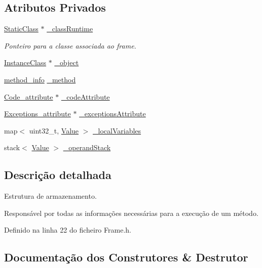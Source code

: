 \subsection*{Atributos Privados}
\begin{DoxyCompactItemize}
\item 
\hyperlink{classStaticClass}{Static\+Class} $\ast$ \hyperlink{classFrame_aa6f380f48c5bac83780daed06dc04f9e}{\+\_\+class\+Runtime}
\begin{DoxyCompactList}\small\item\em Ponteiro para a classe associada ao frame. \end{DoxyCompactList}\item 
\hyperlink{classInstanceClass}{Instance\+Class} $\ast$ \hyperlink{classFrame_a618b0873a50306f7805ea09685e8eee9}{\+\_\+object}
\item 
\hyperlink{structmethod__info}{method\+\_\+info} \hyperlink{classFrame_af9658f71efb91988fa39a224ce9ec9c6}{\+\_\+method}
\item 
\hyperlink{structCode__attribute}{Code\+\_\+attribute} $\ast$ \hyperlink{classFrame_a0b7e80617513d7c1879e20510622103d}{\+\_\+code\+Attribute}
\item 
\hyperlink{structExceptions__attribute}{Exceptions\+\_\+attribute} $\ast$ \hyperlink{classFrame_a5e98b7eb6642b16c03a75ec1f96c4fc4}{\+\_\+exceptions\+Attribute}
\item 
map$<$ uint32\+\_\+t, \hyperlink{structValue}{Value} $>$ \hyperlink{classFrame_af9a215cbac749f3f51e1e7fe239f2010}{\+\_\+local\+Variables}
\item 
stack$<$ \hyperlink{structValue}{Value} $>$ \hyperlink{classFrame_abb8b7f1997e7f3da06d6b0f9aaf61ab2}{\+\_\+operand\+Stack}
\end{DoxyCompactItemize}


\subsection{Descrição detalhada}
Estrutura de armazenamento. 

Responsável por todas as informações necessárias para a execução de um método. 

Definido na linha 22 do ficheiro Frame.\+h.



\subsection{Documentação dos Construtores \& Destrutor}
\mbox{\label{classFrame_a3318a2cfd762b3a31adc4f101cb006e6}} 
